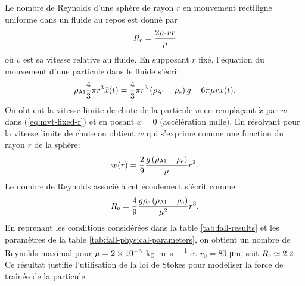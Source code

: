 \begin{remarque}
  Le nombre de Reynolds d'une sphère de rayon $r$ en mouvement
  rectiligne uniforme dans un fluide au repos est donné par
  \begin{equation*}
    R_{\mathrm e} = \frac{2 \rho_\mathrm{e} v r}{\mu}
  \end{equation*}
  où $v$ est sa vitesse relative au fluide.  En supposant $r$ fixé,
  l'équation du mouvement d'une particule dans le fluide s'écrit
  \begin{equation}\label{eq:mvt-fixed-r}
    \rho_\mathrm{Al} \frac{4}{3}\pi r^3 \ddot x(t) = \frac{4}{3}\pi
    r^3\left( \rho_\mathrm{Al} - \rho_\mathrm{e} \right)g -
  6\pi\mu r\dot x(t).
  \end{equation}
  On obtient la vitesse limite de chute de la particule $w$ en
  remplaçant $\dot x$ par $w$ dans (\ref{eq:mvt-fixed-r}) et en posant $\ddot x
  = 0$ (accélération nulle). En résolvant pour la vitesse limite de
  chute on obtient $w$ qui s'exprime comme une fonction du rayon $r$ de la sphère:
  \begin{equation}\label{eq:terminal-velocity}
    w(r) = \frac{2}{9}\frac{g\left( \rho_\mathrm{Al} - \rho_\mathrm{e} \right)}{\mu}r^2.
  \end{equation}
  Le nombre de Reynolds associé à cet écoulement s'écrit comme
  \begin{equation*}
    R_{\mathrm e} =
    \frac{4}{9}\frac{g\rho_\mathrm{e}\left( \rho_\mathrm{Al} - \rho_\mathrm{e} \right)}{\mu^2}r^3.
  \end{equation*}
  En reprenant les conditions considérées dans la table
  \ref{tab:fall-results} et les paramètres de la table
  \ref{tab:fall-physical-parameters}, on obtient un nombre de Reynolds
  maximal pour $\mu = \num{2e-3}$
  \si{\kilo\gram\per\meter\per\second} et $r_0 = 80$
  \si{\micro\meter}, soit $R_{\mathrm e} \simeq 2.2$. Ce résultat justifie
  l'utilisation de la loi de Stokes pour modéliser la force de traînée
  de la particule.
\end{remarque}

